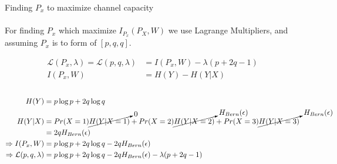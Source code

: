 \documentclass[
  course = {{EE623 Information Theory}},
  quartile = {{4}},
  assignment = 6,
  name = {{Mohammad Mahdi Rahimi}},
  studentnumber = {{20208244}},
  email = {{mahi@kaist.ac.kr}},
  firstexercise = 1
]{aga-homework}
\begin{document}
\exercise Finding $P_x$ to maximize channel capacity
\\\\
For finding $P_x$ which maximize $I_{P_x}(P_X, W)$ we use Lagrange Multipliers, and assuming $P_x$ is to form of $[p,q,q]$. 

\begin{equation} \label{eq3}
\begin{split}
\mathcal{L}(P_x, \lambda) = \mathcal{L}(p, q, \lambda) & = I(P_x, W) - \lambda(p + 2q - 1) \\
I(P_x, W) & = H(Y) - H(Y|X)
\end{split}
\end{equation}\\

\begin{equation} \label{eq3}
\begin{split}
H(Y) & =  p\log{p} + 2q\log{q}\\
H(Y|X) & =  Pr(X=1)\cancelto{0}{H(Y|X=1)}+Pr(X=2)\cancelto{H_{Bern}(\epsilon)}{H(Y|X=2)}+Pr(X=3)\cancelto{H_{Bern}(\epsilon)}{H(Y|X=3)}\\
& = 2qH_{Bern}(\epsilon)\\
\Rightarrow I(P_x, W) & = p\log{p} + 2q\log{q} - 2qH_{Bern}(\epsilon)\\
\Rightarrow \mathcal{L}(p, q, \lambda) & = p\log{p} + 2q\log{q} - 2qH_{Bern}(\epsilon) - \lambda(p + 2q - 1)
\end{split}
\end{equation}
\end{document}
